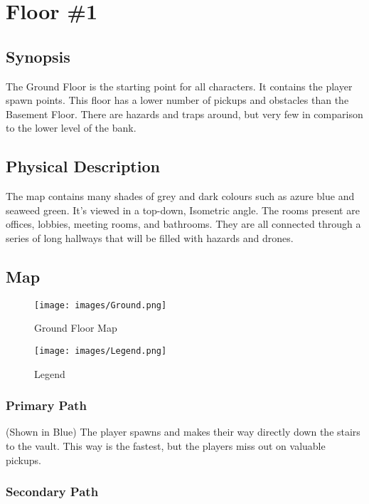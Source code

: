 \documentclass[11pt]{report}
\begin{document}
\section{Floor \#1}

\subsection{Synopsis}

The Ground Floor is the starting point for all characters. It contains the player spawn points. This floor has a lower number of pickups and obstacles than the Basement Floor. There are hazards and traps around, but very few in comparison to the lower level of the bank.

\subsection{Physical Description}

The map contains many shades of grey and dark colours such as azure blue and seaweed green. It’s viewed in a top-down, Isometric angle. The rooms present are offices, lobbies, meeting rooms, and bathrooms. They are all connected through a series of long hallways that will be filled with hazards and drones.

\subsection{Map}

\begin{figure}[H]
    \centering
    \texttt{[image: images/Ground.png]}
    \caption{Ground Floor Map}
\end{figure}

\begin{figure}[H]
    \centering
    \texttt{[image: images/Legend.png]}
    \caption{Legend}
\end{figure}

\subsubsection{Primary Path}

(Shown in Blue) The player spawns and makes their way directly down the stairs to the vault. This way is the fastest, but the players miss out on valuable pickups.

\subsubsection{Secondary Path}
\end{document}
